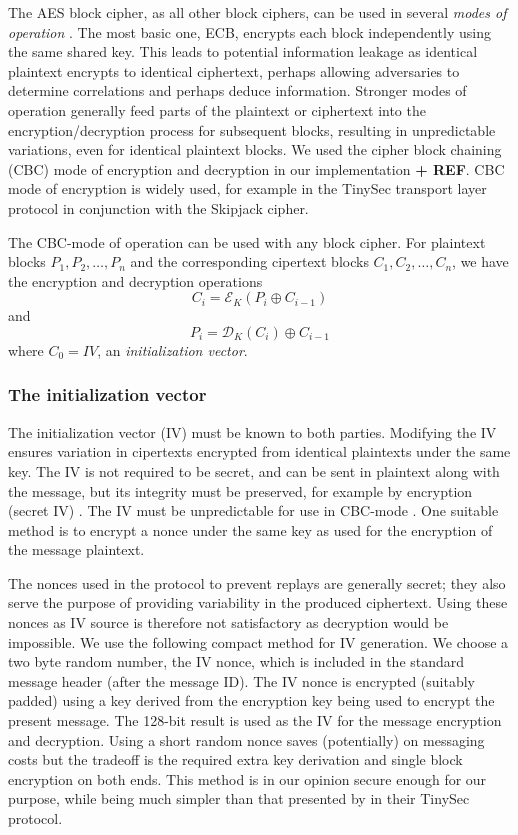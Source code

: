 The AES block cipher, as all other block ciphers, can be used in several \textit{modes of operation} . The most basic one, ECB, encrypts each block independently using the same shared key.  This leads to potential information leakage as identical plaintext encrypts to identical ciphertext, perhaps allowing adversaries to determine correlations and perhaps deduce information. Stronger modes of operation generally feed parts of the plaintext or ciphertext into the encryption/decryption process for subsequent blocks, resulting in unpredictable variations, even for identical plaintext blocks. We used the cipher block chaining (CBC) mode of encryption and decryption in our implementation \textbf{ + REF}. CBC mode of encryption is widely used, for example in the TinySec transport layer protocol  in conjunction with the Skipjack \cite{} cipher.

The CBC-mode of operation can be used with any block cipher. For plaintext blocks $P_1, P_2, \dots, P_n$ and the corresponding cipertext blocks $C_1, C_2, \dots, C_n$, we have the encryption and decryption operations
\[
C_i = \mathcal{E}_K(P_i \oplus C_{i-1})
\]
and 
\[
P_i = \mathcal{D}_K(C_i) \oplus C_{i-1}
\]
where $C_0=IV$, an \textit{initialization vector}. 

\subsubsection{The initialization vector}

The initialization vector (IV) must be known to both parties. Modifying the IV ensures variation in cipertexts encrypted from identical plaintexts under the same key. The IV is not required to be secret, and can be sent in plaintext along with the message, but its integrity must be preserved, for example by encryption (secret IV) . The IV must be unpredictable for use in CBC-mode . One suitable method is to encrypt a nonce under the same key as used for the encryption of the message plaintext. 

The nonces used in the protocol to prevent replays are generally secret; they also serve the purpose of providing variability in the produced ciphertext. Using these nonces as IV source is therefore not satisfactory as decryption would be impossible. We use the following compact method for IV generation. We choose a two byte random number, the IV nonce, which is included in the standard message header (after the message ID). The IV nonce is encrypted (suitably padded) using a key derived from the encryption key being used to encrypt the present message. The 128-bit result is used as the IV for the message encryption and decryption. Using a short random nonce saves (potentially) on messaging costs but the tradeoff is the required extra key derivation and single block encryption on both ends.
%
This method is in our opinion secure enough for our purpose, while being much simpler than that presented by  in their TinySec protocol.

